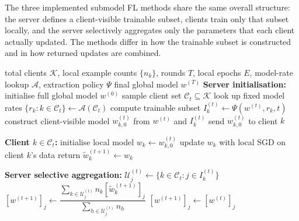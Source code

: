 The three implemented submodel FL methods share the same overall structure: the server defines a client-visible trainable subset, clients train only that subset locally, and the server selectively aggregates only the parameters that each client actually updated. The methods differ in how the trainable subset is constructed and in how returned updates are combined.

\begin{algorithm}[H]
\caption{\textcolor{heteroflblue}{\texttt{HeteroFL}}, \textcolor{fedrolexpurple}{\texttt{FedRolex}}, and \textcolor{fiarsered}{\texttt{FIARSE}}}
\label{alg:partial_training_family}
\begin{algorithmic}[1]
\Require total clients $\mathcal{K}$, local example counts $\{n_k\}$, rounds $T$, local epochs $E$, model-rate lookup $\mathcal{A}$, extraction policy $\Psi$
\Ensure final global model $w^{(T)}$
\Statex \textbf{Server initialisation:}
\State initialise full global model $w^{(0)}$
    \State sample client set $\mathcal{C}_t \subseteq \mathcal{K}$
    \State look up fixed model rates $\{r_k : k \in \mathcal{C}_t\} \gets \mathcal{A}(\mathcal{C}_t)$
        \State compute trainable subset $I_k^{(t)} \gets \Psi(w^{(t)}, r_k, t)$ \Comment{\textcolor{heteroflblue}{static nested} / \textcolor{fedrolexpurple}{rolling window} / \textcolor{fiarsered}{sparse mask}}
        \State construct client-visible model $w_{k,0}^{(t)}$ from $w^{(t)}$ and $I_k^{(t)}$
        \State send $w_{k,0}^{(t)}$ to client $k$
    \EndFor

    \Statex
    \Statex \hspace{1em}\textbf{Client $k \in \mathcal{C}_t$:}
    \State initialise local model $w_k \gets w_{k,0}^{(t)}$
        \State update $w_k$ with local SGD on client $k$'s data
    \EndFor
    \State return $\tilde{w}_k^{(t+1)} \gets w_k$

    \Statex
    \Statex \textbf{Server selective aggregation:}
        \State $\mathcal{U}_j^{(t)} \gets \{k \in \mathcal{C}_t : j \in I_k^{(t)}\}$
            \State $[w^{(t+1)}]_j \gets
            \dfrac{\sum_{k \in \mathcal{U}_j^{(t)}} n_k [\tilde{w}_k^{(t+1)}]_j}
                  {\sum_{h \in \mathcal{U}_j^{(t)}} n_h}$ 
        \Else
            \State $[w^{(t+1)}]_j \gets [w^{(t)}]_j$
        \EndIf
    \EndFor
\EndFor
\end{algorithmic}
\end{algorithm}

